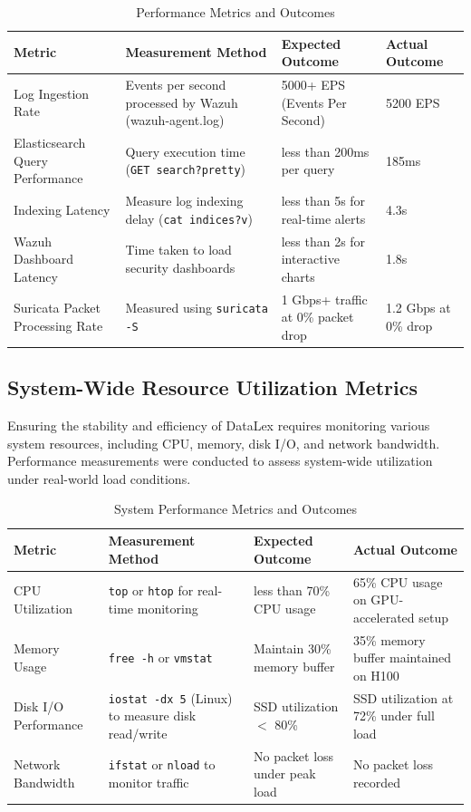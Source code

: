 \begin{table}[h!]
\centering
\begin{tabular}{p{2.7cm}p{3.6cm}p{3.6cm}p{2.5cm}}
\hline
\textbf{Metric} & \textbf{Measurement Method} & \textbf{Expected Outcome} & \textbf{Actual Outcome} \\
\hline
Log Ingestion Rate & Events per second processed by Wazuh (wazuh-agent.log) & 5000+ EPS (Events Per Second) & 5200 EPS \\
Elasticsearch Query Performance & Query execution time (\texttt{GET search?pretty}) & less than 200ms per query & 185ms \\
Indexing Latency & Measure log indexing delay (\texttt{cat indices?v}) & less than 5s for real-time alerts & 4.3s \\
Wazuh Dashboard Latency & Time taken to load security dashboards & less than 2s for interactive charts & 1.8s \\
Suricata Packet Processing Rate & Measured using \texttt{suricata -S} & 1 Gbps+ traffic at 0\% packet drop & 1.2 Gbps at 0\% drop \\
\hline
\end{tabular}
\caption{Performance Metrics and Outcomes}
\label{tab:performance-metrics-outcomes}
\end{table}

\subsection{System-Wide Resource Utilization Metrics}
\label{subsec_system_wide_resource_utilization}

Ensuring the stability and efficiency of DataLex requires monitoring various system resources, including CPU, memory, disk I/O, and network bandwidth. Performance measurements were conducted to assess system-wide utilization under real-world load conditions.

\begin{table}[h!]
\centering
\begin{tabular}{p{2.7cm}p{3.4cm}p{3.4cm}p{3.4cm}}
\hline
\textbf{Metric} & \textbf{Measurement Method} & \textbf{Expected Outcome} & \textbf{Actual Outcome} \\
\hline
CPU Utilization & \texttt{top} or \texttt{htop} for real-time monitoring & less than 70\% CPU usage & 65\% CPU usage on GPU-accelerated setup \\
Memory Usage & \texttt{free -h} or \texttt{vmstat} & Maintain 30\% memory buffer & 35\% memory buffer maintained on H100 \\
Disk I/O Performance & \texttt{iostat -dx 5} (Linux) to measure disk read/write & SSD utilization $<$ 80\% & SSD utilization at 72\% under full load \\
Network Bandwidth & \texttt{ifstat} or \texttt{nload} to monitor traffic & No packet loss under peak load & No packet loss recorded \\
\hline
\end{tabular}
\caption{System Performance Metrics and Outcomes}
\label{tab:system-performance-metrics-outcomes}
\end{table}

